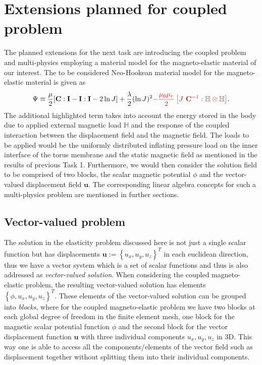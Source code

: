 \section{Extensions planned for coupled problem}
The planned extensions for the next task are introducing the coupled problem and multi-physics employing a material model for the magneto-elastic material of our interest. The to be considered Neo-Hookean material model for the magneto-elastic material is given as
\begin{equation}
\Psi \equiv \dfrac{\mu}{2} [\mathbf{C} : \mathbf{I} - \mathbf{I} : \mathbf{I} - 2 \ln J] + \dfrac{\lambda}{2} (\ln J)^2 \textcolor{red}{- \dfrac{\mu_0 \mu_r}{2} \left[ J \ \mathbf{C}^{-1} : \mathbb{H} \otimes \mathbb{H} \right]}.
\end{equation}
The additional highlighted term takes into account the energy stored in the body due to applied external magnetic load $\mathbb{H}$ and the response of the coupled interaction between the displacement field and the magnetic field. The loads to be applied would be the uniformly distributed inflating pressure load on the inner interface of the torus membrane and the static magnetic field as mentioned in the results of previous Task 1. Furthermore, we would then consider the solution field to be comprised of two blocks, the scalar magnetic potential $\phi$ and the vector-valued displacement field $\mathbf{u}$. The corresponding linear algebra concepts for such a multi-physics problem are mentioned in further sections.

\subsection{Vector-valued problem} 
The solution in the elasticity problem discussed here is not just a single scalar function but has displacements $\mathbf{u} := \left\lbrace u_x, u_y, u_z \right\rbrace^T$ in each euclidean direction, thus we have a vector system which is a set of scalar functions and thus is also addressed as \textit{vector-valued solution}. When considering the coupled magneto-elastic problem, the resulting vector-valued solution has elements $\left\lbrace \phi, u_x, u_y, u_z \right\rbrace^T$. These elements of the vector-valued solution can be grouped into \textit{blocks}, where for the coupled magneto-elastic problem we have two blocks at each global degree of freedom in the finite element mesh, one block for the magnetic scalar potential function $\phi$ and the second block for the vector displacement function $\mathbf{u}$ with three individual components $u_x, u_y, u_z$ in 3D. This way one is able to access all the components/elements of the vector field such as displacement together without splitting them into their individual components. 


